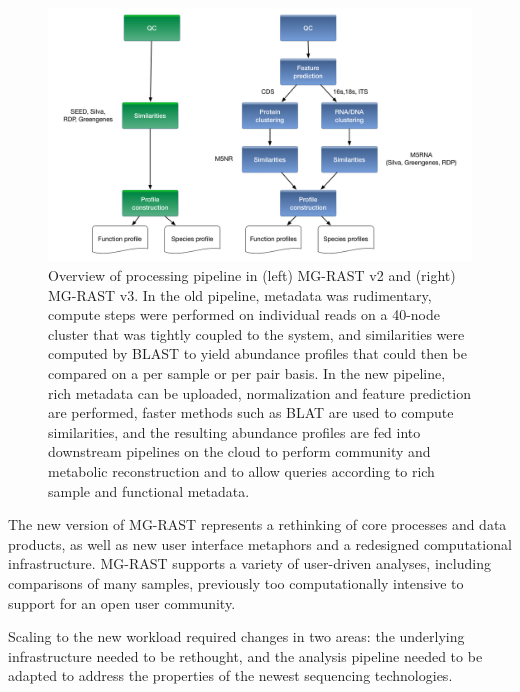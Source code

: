 \documentclass[12pt,fullpage]{report}
\begin{document}
\begin{figure}
\begin{center}
\includegraphics[width=6in]{Images/mgrastv2VSv3.png}
\end{center}
\caption{
Overview of processing pipeline in (left) MG-RAST v2 and (right) MG-RAST v3. In the old pipeline, metadata was rudimentary, compute steps were performed on individual reads on a 40-node cluster that was tightly coupled to the system, and similarities were computed by BLAST to yield abundance profiles that could then be compared on a per sample or per pair basis. In the new pipeline, rich metadata can be uploaded, normalization and feature prediction are performed, faster methods such as BLAT are used to compute similarities, and the resulting abundance profiles are fed into downstream pipelines on the cloud to perform community and metabolic reconstruction and to allow queries according to rich sample and functional metadata.
}
\label{fig:mgrastv2VSv3}
\end{figure}

The new version of MG-RAST represents a rethinking of core processes and data products, as well as new user interface metaphors and a redesigned computational infrastructure. MG-RAST supports a variety of user-driven analyses, including comparisons of many samples, previously too computationally intensive to support for an open user community.

Scaling to the new workload required changes in two areas: the underlying infrastructure needed to be rethought, and the analysis pipeline needed to be adapted to address the properties of the newest sequencing technologies.
\end{document}
